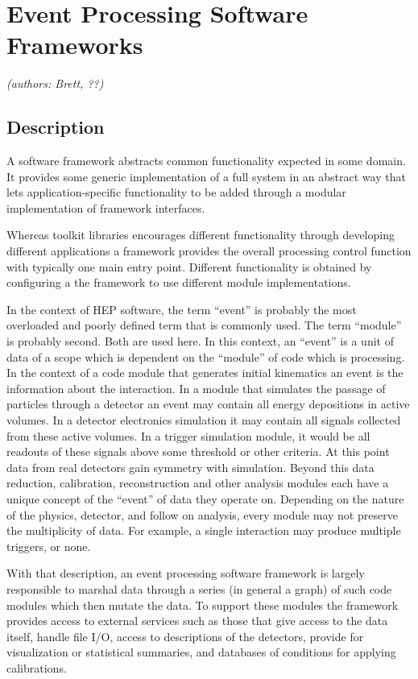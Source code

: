 \section{Event Processing Software Frameworks}
\textit{(authors: Brett, ??)}

\subsection{Description}

A software framework abstracts common functionality expected in some
domain.  It provides some generic implementation of a full system in
an abstract way that lets application-specific functionality to be
added through a modular implementation of framework interfaces.

Whereas toolkit libraries encourages different functionality through
developing different applications a framework provides the overall
processing control function with typically one main entry point.
Different functionality is obtained by configuring a the framework to
use different module implementations.

In the context of HEP software, the term ``event'' is probably the
most overloaded and poorly defined term that is commonly used.  The
term ``module'' is probably second.  Both are used here.  In this
context, an ``event'' is a unit of data of a scope which is dependent
on the ``module'' of code which is processing.  In the context of a
code module that generates initial kinematics an event is the
information about the interaction.  In a module that simulates the
passage of particles through a detector an event may contain all
energy depositions in active volumes.  In a detector electronics
simulation it may contain all signals collected from these active
volumes.  In a trigger simulation module, it would be all readouts of
these signals above some threshold or other criteria.  At this point
data from real detectors gain symmetry with simulation.  Beyond this
data reduction, calibration, reconstruction and other analysis modules
each have a unique concept of the ``event'' of data they operate on.
Depending on the nature of the physics, detector, and follow on
analysis, every module may not preserve the multiplicity of data.  For
example, a single interaction may produce multiple triggers, or none.

With that description, an event processing software framework is
largely responsible to marshal data through a series (in general a
graph) of such code modules which then mutate the data.  To support
these modules the framework provides access to external services such
as those that give access to the data itself, handle file I/O, access
to descriptions of the detectors, provide for visualization or
statistical summaries, and databases of conditions for applying
calibrations.

